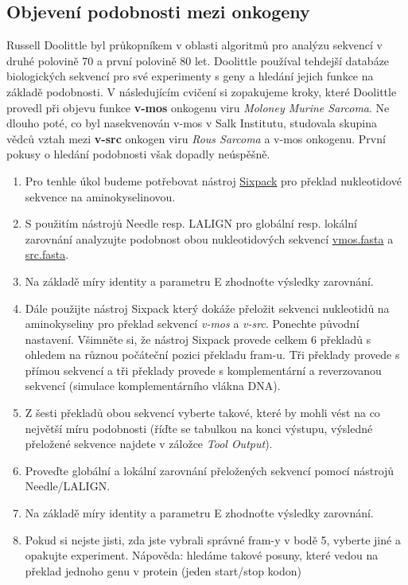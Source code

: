 \documentclass[11pt]{article}
\begin{document}
\subsection{Objevení podobnosti mezi onkogeny}
\label{sec:orgba185a2}
Russell Doolittle byl průkopníkem v oblasti algoritmů pro analýzu sekvencí v
druhé polovině 70 a první polovině 80 let. Doolittle používal tehdejší databáze
biologických sekvencí pro své experimenty s geny a hledání jejich funkce na
základě podobnosti. V následujícím cvičení si zopakujeme kroky, které Doolittle
provedl při objevu funkce \textbf{v-mos} onkogenu viru \emph{Moloney Murine Sarcoma}. Ne dlouho
poté, co byl nasekvenován v-mos v Salk Institutu, studovala skupina vědců vztah
mezi \textbf{v-src} onkogen viru \emph{Rous Sarcoma} a v-mos onkogenu. První pokusy o hledání
podobnosti však dopadly neúspěšně.

\begin{enumerate}
\item Pro tenhle úkol budeme potřebovat nástroj \href{https://www.ebi.ac.uk/Tools/st/emboss\_sixpack/}{Sixpack} pro překlad nukleotidové
sekvence na aminokyselinovou.
\item S použitím nástrojů Needle resp. LALIGN pro globální resp. lokální zarovnání
analyzujte podobnost obou nukleotidových sekvencí \href{data/vmos.fasta}{vmos.fasta} a \href{data/src.fasta}{src.fasta}.
\item Na základě míry identity a parametru E zhodnoťte výsledky zarovnání.
\item Dále použijte nástroj Sixpack který dokáže přeložit sekvenci nukleotidů na
aminokyseliny pro překlad sekvencí \emph{v-mos} a \emph{v-src}.  Ponechte původní
nastavení. Všimněte si, že nástroj Sixpack provede celkem 6 překladů s
ohledem na různou počáteční pozici překladu fram-u. Tři překlady provede s
přímou sekvencí a tři překlady provede s komplementární a reverzovanou
sekvencí (simulace komplementárního vlákna DNA).
\item Z šesti překladů obou sekvencí vyberte takové, které by mohli vést na co
největší míru podobnosti (říďte se tabulkou na konci výstupu, výsledné
přeložené sekvence najdete v záložce \emph{Tool Output}).
\item Proveďte globální a lokální zarovnání přeložených sekvencí pomocí nástrojů
Needle/LALIGN.
\item Na základě míry identity a parametru E zhodnoťte výsledky zarovnání.
\item Pokud si nejste jisti, zda jste vybrali správné fram-y v bodě 5, vyberte jiné
a opakujte experiment. Nápověda: hledáme takové posuny, které vedou na
překlad jednoho genu v protein (jeden start/stop kodon)
\end{enumerate}
\end{document}
